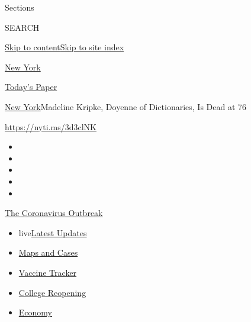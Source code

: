 Sections

SEARCH

\protect\hyperlink{site-content}{Skip to
content}\protect\hyperlink{site-index}{Skip to site index}

\href{https://www.nytimes.com/section/nyregion}{New York}

\href{https://myaccount.nytimes.com/auth/login?response_type=cookie\&client_id=vi}{}

\href{https://www.nytimes.com/section/todayspaper}{Today's Paper}

\href{/section/nyregion}{New York}\textbar{}Madeline Kripke, Doyenne of
Dictionaries, Is Dead at 76

\url{https://nyti.ms/3d3clNK}

\begin{itemize}
\item
\item
\item
\item
\item
\end{itemize}

\href{https://www.nytimes.com/news-event/coronavirus?action=click\&pgtype=Article\&state=default\&region=TOP_BANNER\&context=storylines_menu}{The
Coronavirus Outbreak}

\begin{itemize}
\tightlist
\item
  live\href{https://www.nytimes.com/2020/08/03/world/coronavirus-covid-19.html?action=click\&pgtype=Article\&state=default\&region=TOP_BANNER\&context=storylines_menu}{Latest
  Updates}
\item
  \href{https://www.nytimes.com/interactive/2020/us/coronavirus-us-cases.html?action=click\&pgtype=Article\&state=default\&region=TOP_BANNER\&context=storylines_menu}{Maps
  and Cases}
\item
  \href{https://www.nytimes.com/interactive/2020/science/coronavirus-vaccine-tracker.html?action=click\&pgtype=Article\&state=default\&region=TOP_BANNER\&context=storylines_menu}{Vaccine
  Tracker}
\item
  \href{https://www.nytimes.com/2020/08/02/us/covid-college-reopening.html?action=click\&pgtype=Article\&state=default\&region=TOP_BANNER\&context=storylines_menu}{College
  Reopening}
\item
  \href{https://www.nytimes.com/live/2020/08/03/business/stock-market-today-coronavirus?action=click\&pgtype=Article\&state=default\&region=TOP_BANNER\&context=storylines_menu}{Economy}
\end{itemize}

